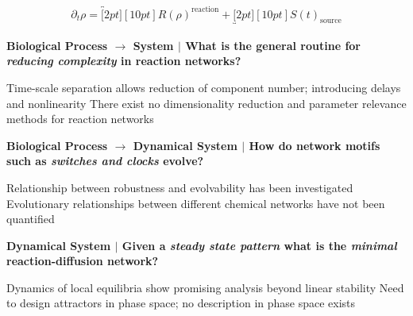 \documentclass[a0,portrait]{a0poster}
\begin{document}
\begin{align*}
	\partial_t\rho =
	\overbracket[2pt][10pt]{R(\rho)}^{\text{reaction}}+
	\underbracket[2pt][10pt]{S(t)}_{\text{source}}
\end{align*}

\begin{tcolorbox}[boxrule=2pt,arc=3.4pt,boxsep=2mm]
	\begin{center}
		\textbf{\color{Grey}Biological Process $\rightarrow$ System \color{Black}$|$
		What is the general routine for \textit{reducing complexity} in reaction networks?}
	\end{center}
\end{tcolorbox}

\begin{itemize}[leftmargin=5cm]
	\up Time-scale separation allows reduction of component number; introducing delays and nonlinearity
	\down There exist no dimensionality reduction and parameter relevance methods for reaction networks
\end{itemize}

\begin{tcolorbox}[boxrule=2pt,arc=3.4pt,boxsep=2mm]
	\begin{center}
		\textbf{\color{Grey}Biological Process $\rightarrow$ Dynamical System \color{Black}$|$
		How do network motifs such as \textit{switches and clocks} evolve?}
	\end{center}
\end{tcolorbox}

\begin{itemize}[leftmargin=5cm]
	\up Relationship between robustness and evolvability has been investigated \cite{Daniels2008SloppinessBiology}
	\down Evolutionary relationships between different chemical networks have not been quantified
\end{itemize}

\begin{tcolorbox}[boxrule=2pt,arc=3.4pt,boxsep=2mm]
	\begin{center}
		\textbf{\color{Grey}Dynamical System \color{Black}$|$
		Given a \textit{steady state pattern} what is the \textit{minimal} reaction-diffusion network?}
	\end{center}
\end{tcolorbox}

\begin{itemize}[leftmargin=5cm]
	\up Dynamics of local equilibria show promising analysis beyond linear stability \cite{Halatek2018}
	\down Need to design attractors in phase space; no description in phase space exists
\end{itemize}
\end{document}
